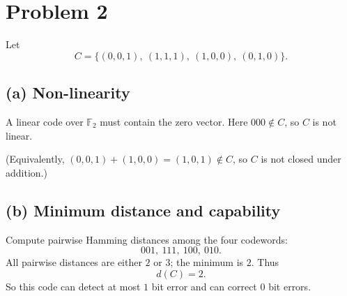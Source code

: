 \section*{Problem 2}

Let
\[
C=\{(0,0,1),\ (1,1,1),\ (1,0,0),\ (0,1,0)\}.
\]

\subsection*{(a) Non-linearity}
A linear code over \(\mathbb{F}_2\) must contain the zero vector.  
Here \(000\notin C\), so \(C\) is not linear.

(Equivalently, \( (0,0,1)+(1,0,0)=(1,0,1)\notin C\), so \(C\) is not closed under addition.)

\subsection*{(b) Minimum distance and capability}

Compute pairwise Hamming distances among the four codewords:
\[
001,\ 111,\ 100,\ 010.
\]
All pairwise distances are either \(2\) or \(3\); the minimum is \(2\). Thus
\[
d(C)=2.
\]
So this code can detect at most \(1\) bit error and can correct \(0\) bit errors.

